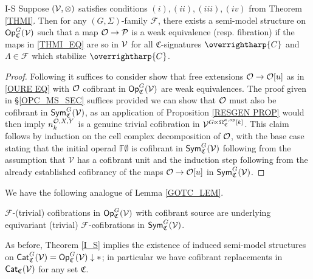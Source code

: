 \documentclass[a4paper,10pt
]{article}%
\renewcommand{\F}{\mathcal F}
\renewcommand{\1}{\eta}%
\newcommand{\vect}[1]{\text{\overrightharp{\ensuremath{#1}}}}
\begin{document}
\begin{customthm}{I-S}
      \label{THM1_S}
      Suppose $(\mathcal V,\otimes)$ satisfies conditions $(i),(ii),(iii),(iv)$ from Theorem \ref{THMI}.
      Then for any $(G, \Sigma)$-family $\F$,
      there exists a semi-model structure on $\mathsf{Op}_{\mathfrak C}^G(\mathcal V)$ such that a map $\mathcal{O} \to \mathcal{P}$ is a weak equivalence (resp. fibration) if the maps in \eqref{THMI_EQ} are so in $\mathcal V$
      for all $\mathfrak C$-signatures $\vect C$ and $\Lambda \in \F$ which stabilize $\vect C$.
\end{customthm}
\begin{proof}
      Following \cite[Thm. 2.2.2]{WY18} it suffices to consider show that free extensions $\mathcal{O} \to \mathcal{O}[u]$ as in \eqref{OURE EQ} with $\mathcal{O}$ cofibrant in $\mathsf{Op}^G_{\mathfrak C}(\mathcal V)$ are weak equivalences.
      The proof given in \S \ref{OPC_MS_SEC} suffices
      provided we can show that $\mathcal{O}$ must also be cofibrant in $\mathsf{Sym}^G_{\mathfrak C}(\mathcal V)$,
      as an application of Proposition \ref{RESGEN PROP} would then imply 
      $n_k^{\mathcal{O},X,Y}$ is a genuine trivial cofibration in $\mathcal V^{G \ltimes \Omega_{\mathfrak C}^{a,op}[k]}$.
      This claim follows by induction on the cell complex decomposition of $\mathcal{O}$,
      with the base case stating that the initial operad $\mathbb{F}\emptyset$ is cofibrant in $\mathsf{Sym}^G_{\mathfrak{C}}(\mathcal V)$
      following from the assumption that $\mathcal{V}$ has a cofibrant unit
      and the induction step following from the already established cofibrancy of the maps $\mathcal{O} \to \mathcal{O}[u]$ in $\mathsf{Sym}^G_{\mathfrak{C}}(\mathcal V)$.
\end{proof}

We have the following analogue of Lemma \ref{GOTC_LEM}.
\begin{corollary}
      \label{LGC_COR}
      $\F$-(trivial) cofibrations in $\mathsf{Op}_{\mathfrak C}^G(\mathcal V)$ with cofibrant source are
      underlying equivariant (trivial) $\F$-cofibrations in $\mathsf{Sym}_{\mathfrak C}^G(\mathcal V)$.
\end{corollary}

\begin{remark}
      As before, Theorem \ref{I_S} implies the existence of induced semi-model structures on
      $\Cat^{G}_{ \mathfrak C}(\V) = \Op^{G}_{\mathfrak C}(\V) \downarrow \**$;
      in particular we have cofibrant replacements in $\mathsf{Cat}_{\mathfrak C}(\mathcal V)$ for any set $\mathfrak C$.
\end{remark}
\end{document}
